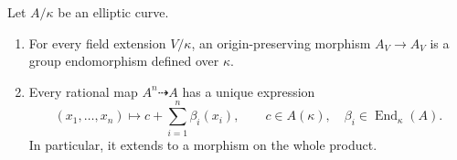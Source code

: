 \begin{lemma}\label{lem:constant-product-maps}
Let $A/\kappa$ be an elliptic curve.
\begin{enumerate}[label=\textup{(\roman*)}]
\item For every field extension $V/\kappa$, an origin-preserving
morphism $A_V\longrightarrow A_V$ is a group endomorphism defined
over $\kappa$.
\item Every rational map $A^n\dashrightarrow A$ has a unique expression
\begin{equation}\label{eq:constant-product-map}
 (x_1,\ldots,x_n)\longmapsto
                  c+\sum_{i=1}^n\beta_i(x_i),
 \qquad c\in A(\kappa),\quad
        \beta_i\in\operatorname{End}_\kappa(A).
\end{equation}
In particular, it extends to a morphism on the whole product.
\end{enumerate}
\end{lemma}

